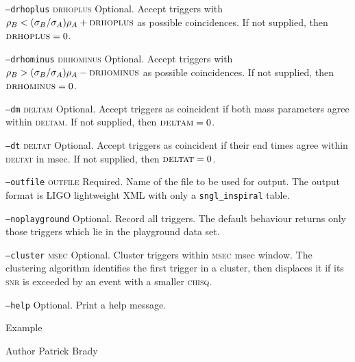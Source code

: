 \begin{entry}
\begin{entry}
\item[\texttt{--drhoplus} \textsc{drhoplus}] Optional. Accept triggers with
$\rho_B < (\sigma_B/\sigma_A) \rho_A + \textsc{drhoplus}$ as
possible coincidences.  If not supplied,  then $\textsc{drhoplus} =
0$.

\item[\texttt{--drhominus} \textsc{drhominus}] Optional. Accept triggers with
$\rho_B > (\sigma_B/\sigma_A) \rho_A - \textsc{drhominus}$ as
possible coincidences.  If not supplied,  then $\textsc{drhominus} =
0$.

\item[\texttt{--dm} \textsc{deltam}] Optional. Accept triggers as coincident if
both mass parameters agree within \textsc{deltam}.  If not supplied,  then 
$\textsc{deltam} = 0$.

\item[\texttt{--dt} \textsc{deltat}] Optional. Accept triggers as coincident if
their end times agree within \textsc{deltat} in msec.  If not supplied,  then 
$\textsc{deltat} = 0$.

\item[\texttt{--outfile} \textsc{outfile}] Required.  Name of the file
to be used for output.  The output format is LIGO lightweight XML with
only a \texttt{sngl\_inspiral} table.

\item[\texttt{--noplayground}] Optional.  Record all triggers.  The
default behaviour returns only those triggers which lie in the
playground data set.  

\item[\texttt{--cluster} \textsc{msec}] Optional.  Cluster triggers
within \textsc{msec} msec window.   The clustering algorithm
identifies the first trigger in a cluster,  then displaces it if its
\textsc{snr} is exceeded by an event with a smaller \textsc{chisq}.

\item[\texttt{--help}] Optional.  Print a help message.
\end{entry}

\item[Example]

\item[Author] 
Patrick Brady
\end{entry}
\clearpage


